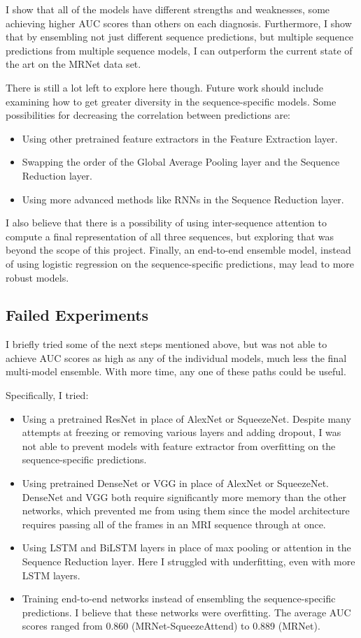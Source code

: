 \documentclass[10pt,twocolumn,letterpaper]{article}
\begin{document}
I show that all of the models have different strengths and weaknesses, some achieving higher AUC scores than others on each diagnosis. Furthermore, I show that by ensembling not just different sequence predictions, but multiple sequence predictions from multiple sequence models, I can outperform the current state of the art on the MRNet data set.

There is still a lot left to explore here though. Future work should include examining how to get greater diversity in the sequence-specific models. Some possibilities for decreasing the correlation between predictions are:
\begin{itemize}
\item Using other pretrained feature extractors in the Feature Extraction layer.
\item Swapping the order of the Global Average Pooling layer and the Sequence
Reduction layer.
\item Using more advanced methods like RNNs in the Sequence Reduction layer.
\end{itemize}

I also believe that there is a possibility of using inter-sequence attention to compute a final representation of all three sequences, but exploring that was beyond the scope of this project. Finally, an end-to-end ensemble model, instead of using logistic regression on the sequence-specific predictions, may lead to more robust models.

\subsection{Failed Experiments}
I briefly tried some of the next steps mentioned above, but was not able to achieve AUC scores as high as any of the individual models, much less the final multi-model ensemble. With more time, any one of these paths could be useful.

Specifically, I tried:
\begin{itemize}
   \item Using a pretrained ResNet in place of AlexNet or SqueezeNet. Despite many attempts at freezing or removing various layers and adding dropout, I was not able to prevent models with feature extractor from overfitting on the sequence-specific predictions.
   \item Using pretrained DenseNet or VGG in place of AlexNet or SqueezeNet. DenseNet and VGG both require significantly more memory than the other networks, which prevented me from using them since the model architecture requires passing all of the frames in an MRI sequence through at once.
   \item Using LSTM and BiLSTM layers in place of max pooling or attention in the Sequence Reduction layer. Here I struggled with underfitting, even with more LSTM layers.
   \item Training end-to-end networks instead of ensembling the sequence-specific predictions. I believe that these networks were overfitting. The average AUC scores ranged from 0.860 (MRNet-SqueezeAttend) to 0.889 (MRNet).
\end{itemize}
\end{document}
